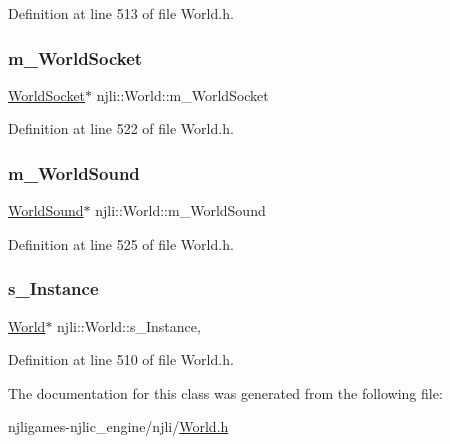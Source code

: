 Definition at line 513 of file World.\+h.

\mbox{\label{classnjli_1_1_world_a0f6ea126555fa904aa246baba084c9de}} 
\subsubsection{\texorpdfstring{m\+\_\+\+World\+Socket}{m\_WorldSocket}}
{\footnotesize\ttfamily \mbox{\hyperlink{classnjli_1_1_world_socket}{World\+Socket}}$\ast$ njli\+::\+World\+::m\+\_\+\+World\+Socket\hspace{0.3cm}{\ttfamily [private]}}



Definition at line 522 of file World.\+h.

\mbox{\label{classnjli_1_1_world_a004cd4a3a730b83733b3ff91bfaedce2}} 
\subsubsection{\texorpdfstring{m\+\_\+\+World\+Sound}{m\_WorldSound}}
{\footnotesize\ttfamily \mbox{\hyperlink{classnjli_1_1_world_sound}{World\+Sound}}$\ast$ njli\+::\+World\+::m\+\_\+\+World\+Sound\hspace{0.3cm}{\ttfamily [private]}}



Definition at line 525 of file World.\+h.

\mbox{\label{classnjli_1_1_world_afbef76d7d011571721a36b2eb625e997}} 
\subsubsection{\texorpdfstring{s\+\_\+\+Instance}{s\_Instance}}
{\footnotesize\ttfamily \mbox{\hyperlink{classnjli_1_1_world}{World}}$\ast$ njli\+::\+World\+::s\+\_\+\+Instance\hspace{0.3cm}{\ttfamily [static]}, {\ttfamily [private]}}



Definition at line 510 of file World.\+h.



The documentation for this class was generated from the following file\+:\begin{DoxyCompactItemize}
\item 
njligames-\/njlic\+\_\+engine/njli/\mbox{\hyperlink{_world_8h}{World.\+h}}\end{DoxyCompactItemize}

